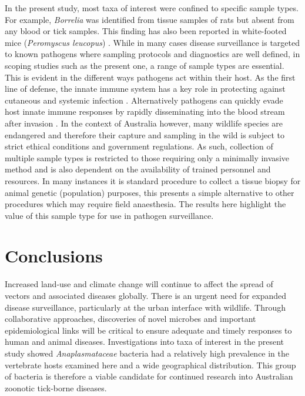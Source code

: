 \documentclass[a4paper, nobind]{templates/ociamthesis}
\begin{document}
In the present study, most taxa of interest were confined to specific sample types. For example, \emph{Borrelia} was identified from tissue samples of rats but absent from any blood or tick samples.
This finding has also been reported in white-footed mice (\emph{Peromyscus leucopus}) \autocite{zawadaOptimizationTissueSampling2020}.
While in many cases disease surveillance is targeted to known pathogens where sampling protocols and diagnostics are well defined, in scoping studies such as the present one, a range of sample types are essential.
This is evident in the different ways pathogens act within their host.
As the first line of defense, the innate immune system has a key role in protecting against cutaneous and systemic infection \autocite{coatesInnateAntimicrobialImmunity2018}.
Alternatively pathogens can quickly evade host innate immune responses by rapidly disseminating into the blood stream after invasion \autocite{kumarIntravitalImagingVascular2015,hydeBorreliaBurgdorferiKeeps2017}.
In the context of Australia however, many wildlife species are endangered and therefore their capture and sampling in the wild is subject to strict ethical conditions and government regulations.
As such, collection of multiple sample types is restricted to those requiring only a minimally invasive method and is also dependent on the availability of trained personnel and resources.
In many instances it is standard procedure to collect a tissue biopsy for animal genetic (population) purposes, this presents a simple alternative to other procedures which may require field anaesthesia.
The results here highlight the value of this sample type for use in pathogen surveillance.

\hypertarget{conclusions}{%
\section{Conclusions}\label{conclusions}}

Increased land-use and climate change will continue to affect the spread of vectors and associated diseases globally.
There is an urgent need for expanded disease surveillance, particularly at the urban interface with wildlife.
Through collaborative approaches, discoveries of novel microbes and important epidemiological links will be critical to ensure adequate and timely responses to human and animal diseases.
Investigations into taxa of interest in the present study showed \emph{Anaplasmataceae} bacteria had a relatively high prevalence in the vertebrate hosts examined here and a wide geographical distribution.
This group of bacteria is therefore a viable candidate for continued research into Australian zoonotic tick-borne diseases.
\end{document}
